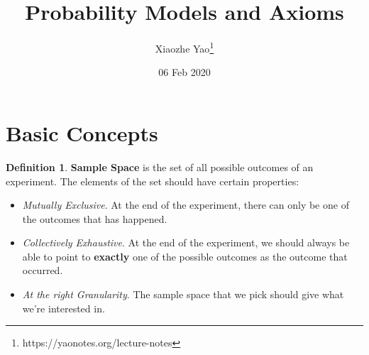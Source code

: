 \documentclass{article}
\title{Probability Models and Axioms}
\author{Xiaozhe Yao\footnote{https://yaonotes.org/lecture-notes}}
\date{06 Feb 2020}
\theoremstyle{definition}
\newtheorem{defi}{Definition}[subsection]
\begin{document}
\maketitle

\section{Basic Concepts}

\begin{defi}
\textbf{Sample Space} is the set of all possible outcomes of an experiment. The elements of the set should have certain properties: \begin{itemize}
    \item \textit{Mutually Exclusive}. At the end of the experiment, there can only be one of the outcomes that has happened.
    \item \textit{Collectively Exhaustive}. At the end of the experiment, we should always be able to point to \textbf{exactly} one of the possible outcomes as the outcome that occurred.
    \item \textit{At the right Granularity}. The sample space that we pick should give what we're interested in.
\end{itemize}
\end{defi}
\end{document}
